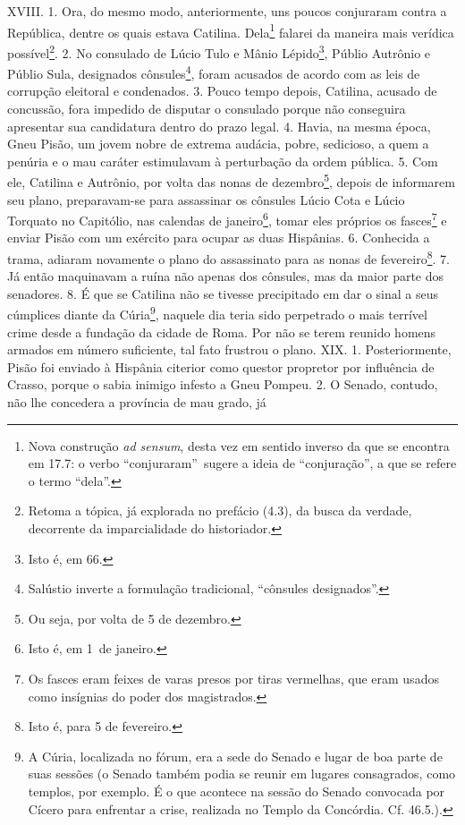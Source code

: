 XVIII. 1. Ora, do mesmo modo, anteriormente, uns poucos conjuraram contra a República, dentre os quais estava Catilina. Dela\footnote{Nova construção \emph{ad
sensum}, desta vez em sentido inverso da que se encontra em 17.7: o verbo
``conjuraram''\ sugere a ideia de ``conjuração'', a que se refere o termo
``dela''.} falarei da maneira mais verídica possível\footnote{Retoma a tópica,
já explorada no prefácio (4.3), da busca da verdade, decorrente da
imparcialidade do historiador.}. 2. No consulado de Lúcio Tulo e Mânio
Lépido\footnote{Isto é, em 66.}, Públio Autrônio e Públio Sula, designados
cônsules\footnote{Salústio inverte a formulação tradicional, ``cônsules
designados''.}, foram acusados de acordo com as leis de corrupção eleitoral e
condenados. 3. Pouco tempo depois, Catilina, acusado de concussão, fora
impedido de disputar o consulado porque não conseguira apresentar sua
candidatura dentro do prazo legal. 4. Havia, na mesma época, Gneu Pisão, um
jovem nobre de extrema audácia, pobre, sedicioso, a quem a penúria e o mau
caráter estimulavam à perturbação da ordem pública. 5. Com ele, Catilina e
Autrônio, por volta das nonas de dezembro\footnote{Ou seja, por volta de 5 de
dezembro.}, depois de informarem seu plano, preparavam-se para assassinar os
cônsules Lúcio Cota e Lúcio Torquato no Capitólio, nas calendas de
janeiro\footnote{Isto é, em 1\oi\ de janeiro.}, tomar eles próprios os
fasces\footnote{Os fasces eram feixes de varas presos por tiras vermelhas, que
eram usados como insígnias do poder dos magistrados.} e enviar Pisão com um
exército para ocupar as duas Hispânias. 6. Conhecida a trama, adiaram novamente
o plano do assassinato para as nonas de fevereiro\footnote{Isto é, para 5 de
fevereiro.}. 7. Já então maquinavam a ruína não apenas dos cônsules, mas da
maior parte dos senadores. 8. É que se Catilina não se tivesse precipitado em
dar o sinal a seus cúmplices diante da Cúria\footnote{A Cúria, localizada no
fórum, era a sede do Senado e lugar de boa parte de suas sessões (o Senado
também podia se reunir em lugares consagrados, como templos, por exemplo. É o
que acontece na sessão do Senado convocada por Cícero para enfrentar a crise,
realizada no Templo da Concórdia. Cf. 46.5.).}, naquele dia teria sido
perpetrado o mais terrível crime desde a fundação da cidade de Roma. Por não se
terem reunido homens armados em número suficiente, tal fato frustrou o plano.
XIX. 1. Posteriormente, Pisão foi enviado à Hispânia citerior como questor
propretor por influência de Crasso, porque o sabia inimigo infesto a Gneu
Pompeu. 2. O Senado, contudo, não lhe concedera a província de mau grado, já
